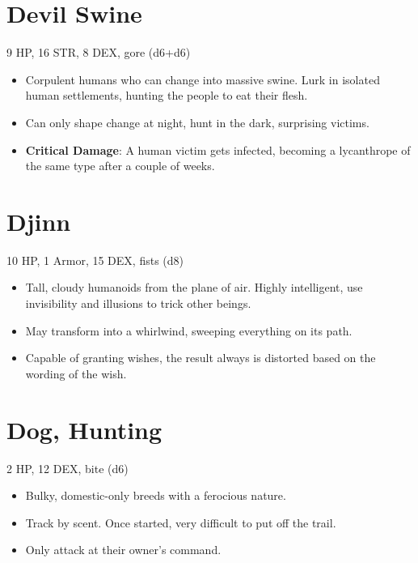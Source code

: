 \documentclass[
  10pt,
  american,
]{article}
\begin{document}
\hypertarget{devil-swine}{%
\section{Devil Swine}\label{devil-swine}}

9 HP, 16 STR, 8 DEX, gore (d6+d6)

\begin{samepage}
\begin{itemize}
\setlength\itemsep{-.5em}
\item Corpulent humans who can change into massive swine. Lurk in isolated human settlements, hunting the people to eat their flesh.
\item Can only shape change at night, hunt in the dark, surprising victims.
\item \textbf{Critical Damage}: A human victim gets infected, becoming a lycanthrope of the same type after a couple of weeks.
\end{itemize}
\end{samepage}

\hypertarget{djinn}{%
\section{Djinn}\label{djinn}}

10 HP, 1 Armor, 15 DEX, fists (d8)

\begin{samepage}
\begin{itemize}
\setlength\itemsep{-.5em}
\item Tall, cloudy humanoids from the plane of air.   Highly intelligent, use invisibility and illusions to trick other beings.
\item May transform into a whirlwind, sweeping everything on its path.
\item Capable of granting wishes, the result always is distorted based on the wording of the wish.
\end{itemize}
\end{samepage}

\hypertarget{dog-hunting}{%
\section{Dog, Hunting}\label{dog-hunting}}

2 HP, 12 DEX, bite (d6)

\begin{samepage}
\begin{itemize}
\setlength\itemsep{-.5em}
\item Bulky, domestic-only breeds with a ferocious nature.
\item Track by scent.   Once started, very difficult to put off the trail.
\item Only attack at their owner’s command.
\end{itemize}
\end{samepage}
\end{document}
